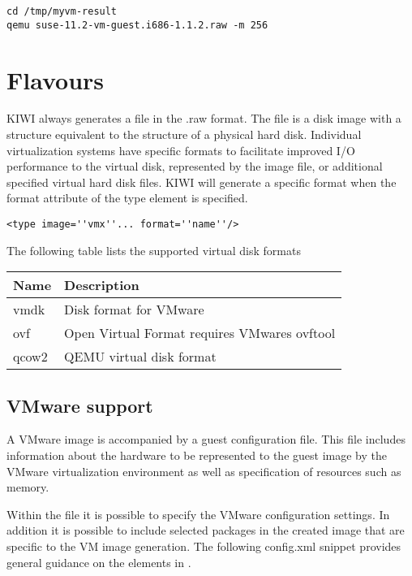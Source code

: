 \begin{Command}{12cm}
\begin{verbatim}
cd /tmp/myvm-result
qemu suse-11.2-vm-guest.i686-1.1.2.raw -m 256
\end{verbatim}
\end{Command}

\section{Flavours}

KIWI always generates a file in the .raw format. The  file is a disk
image with a structure equivalent to the structure of a physical hard disk. 
Individual virtualization systems have specific formats to facilitate
improved I/O performance to the virtual disk, represented by the image file,
or additional specified virtual hard disk files. KIWI will generate a 
specific format when the format attribute of the type element is specified.


\begin{Command}{12cm}
\begin{verbatim}
<type image=''vmx''... format=''name''/>
\end{verbatim}
\end{Command}

The following table lists the supported virtual disk formats

\begin{tabular}[h]{|p{2cm}|p{9cm}|}
\hline
\textbf{Name} & \textbf{Description} \\
\hline
vmdk        & Disk format for VMware \\
ovf         & Open Virtual Format requires VMwares ovftool \\
qcow2       & QEMU virtual disk format  \\
\hline
\end{tabular}

\subsection{VMware support}

A VMware image is accompanied by a guest configuration file. This file 
includes information about the hardware to be represented to the guest 
image by the VMware virtualization environment as well as specification
of resources such as memory. 

Within the  file it is possible to specify the VMware configuration
settings. In addition it is possible to include selected packages in the 
created image that are specific to the VM image generation. The following
config.xml snippet provides general guidance on the elements in .

